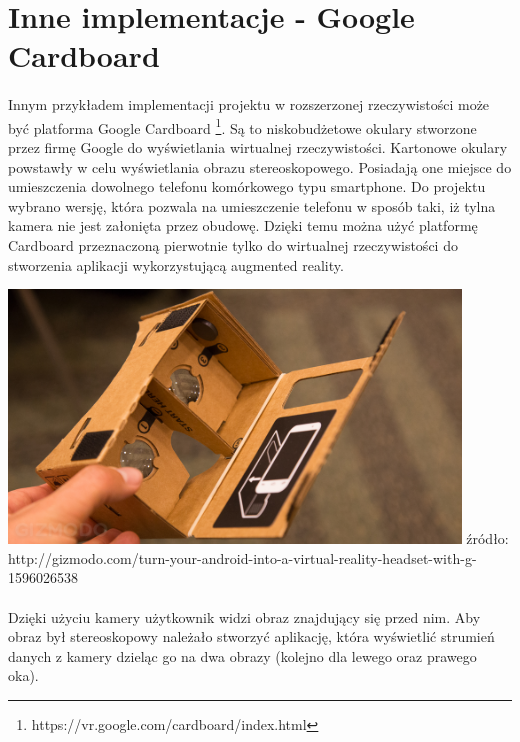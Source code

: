 \newpage
\section{Inne implementacje - Google Cardboard}
\paragraph{}
Innym przykładem implementacji projektu w rozszerzonej rzeczywistości może być platforma Google Cardboard \footnote{https://vr.google.com/cardboard/index.html}. Są to niskobudżetowe okulary stworzone przez firmę Google do wyświetlania wirtualnej rzeczywistości. Kartonowe okulary powstawły w celu wyświetlania obrazu stereoskopowego. Posiadają one miejsce do umieszczenia dowolnego telefonu komórkowego typu smartphone. Do projektu wybrano wersję, która pozwala na umieszczenie telefonu w sposób taki, iż tylna kamera nie jest załonięta przez obudowę. Dzięki temu można użyć platformę Cardboard przeznaczoną pierwotnie tylko do wirtualnej rzeczywistości do stworzenia aplikacji wykorzystującą augmented reality.

\begin{center}
\includegraphics[width=0.9\textwidth]{images/cardboard.jpg}
\small {źródło: http://gizmodo.com/turn-your-android-into-a-virtual-reality-headset-with-g-1596026538 }
\end{center}

\paragraph{}
Dzięki użyciu kamery użytkownik widzi obraz znajdujący się przed nim. Aby obraz był stereoskopowy należało stworzyć aplikację, która wyświetlić strumień danych z kamery dzieląc go na dwa obrazy (kolejno dla lewego oraz prawego oka).

